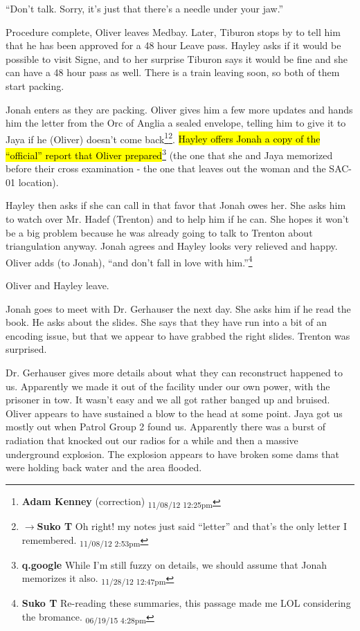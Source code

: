 ``Don't talk.  Sorry, it's just that there's a needle under your jaw.''

Procedure complete, Oliver leaves Medbay.  Later, Tiburon stops by to tell him that he has been approved for a 48 hour Leave pass.  Hayley asks if it would be possible to visit Signe, and to her surprise Tiburon says it would be fine and she can have a 48 hour pass as well.  There is a train leaving soon, so both of them start packing.



Jonah enters as they are packing.  Oliver gives him a few more updates and hands him the letter from the Orc of Anglia  a sealed envelope, telling him to give it to Jaya if he (Oliver) doesn't come back\footnote{\textbf{Adam Kenney }(correction) \textsubscript{11/08/12 12:25pm}}\footnote{$\rightarrow$\textbf{Suko T }Oh right!  my notes just said ``letter'' and that's the only letter I remembered. \textsubscript{11/08/12 2:53pm}}.  \hl{Hayley offers Jonah a copy of the ``official'' report that Oliver prepared}\footnote{\textbf{q.google }While I'm still fuzzy on details, we should assume that Jonah memorizes it also. \textsubscript{11/28/12 12:47pm}} (the one that she and Jaya memorized before their cross examination - the one that leaves out the woman and the SAC-01 location).



Hayley then asks if she can call in that favor that Jonah owes her.  She asks him to watch over Mr. Hadef (Trenton) and to help him if he can.  She hopes it won't be a big problem because he was already going to talk to Trenton about triangulation anyway.  Jonah agrees and Hayley looks very relieved and happy.  Oliver adds (to Jonah), ``and don't fall in love with him.''\footnote{\textbf{Suko T }Re-reading these summaries, this passage made me LOL considering the bromance. \textsubscript{06/19/15 4:28pm}}



Oliver and Hayley leave.  



Jonah goes to meet with Dr. Gerhauser the next day. She asks him if he read the book. He asks about the slides.  She says that they have run into a bit of an encoding issue, but that we appear to have grabbed the right slides. Trenton was surprised.



Dr. Gerhauser gives more details about what they can reconstruct happened to us.  Apparently we made it out of the facility under our own power, with the prisoner in tow.  It wasn't easy and we all got rather banged up and bruised.  Oliver appears to have sustained a blow to the head at some point.  Jaya got us mostly out when Patrol Group 2 found us.  Apparently there was a burst of radiation that knocked out our radios for a while and then a massive underground explosion. The explosion appears to have broken some dams that were holding back water and the area flooded.




